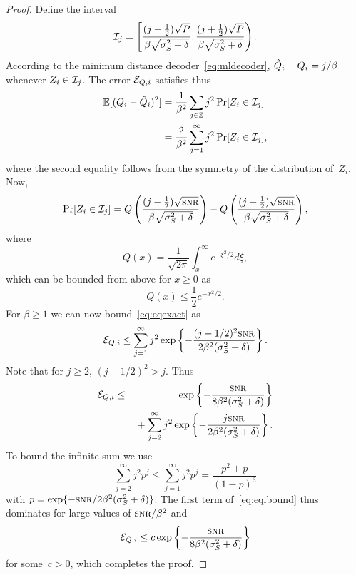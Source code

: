 \begin{proof}
  Define the interval
  \begin{equation*}
    \mathcal{I}_j = \left[ \frac{(j - \frac12) \sqrt{P}}{\beta \sqrt{{\sigma_S^2} + \delta}},
    \frac{(j + \frac12) \sqrt{P}}{\beta \sqrt{{\sigma_S^2} + \delta}} \right).
  \end{equation*}
  According to the minimum distance decoder~\eqref{eq:mldecoder}, $\hat{Q}_i - Q_i
  = j/\beta$ whenever $Z_i \in \mathcal{I}_j$.  The error ${{\mathcal{E}}_{Q,i}}$ satisfies thus
  \begin{align}
    \mathbb{E}[(Q_i - \hat{Q}_i)^2] &= \frac{1}{\beta^2} \sum_{j \in \mathbb{Z}} j^2 \Pr[Z_i \in
    \mathcal{I}_j]  \nonumber \\
    &= \frac{2}{\beta^2} \sum_{j = 1}^\infty j^2 \Pr[Z_i \in \mathcal{I}_j],
    \label{eq:eqexact}
  \end{align}
  where the second equality follows from the symmetry of the distribution
  of~$Z_i$. Now,
  \begin{equation*}
    \Pr[Z_i \in \I_j] = Q\left( \frac{(j - \frac12) \sqrt \snr}{\beta \sqrt{\ssq
    + \delta }} \right) - Q\left( \frac{(j + \frac12) \sqrt{\snr}}{\beta
    \sqrt{\ssq + \delta}} \right),
  \end{equation*}
  where
  \begin{equation*}
    Q(x) = \frac{1}{\sqrt{2\pi}} \int_x^\infty e^{-\xi^2/2} d\xi,
  \end{equation*}
  which can be bounded from above for $x \ge 0$ as
  \begin{equation*}
    Q(x) \le \frac12 e^{-x^2/2}.
  \end{equation*}
  For $\beta \ge 1$ we can now bound~\eqref{eq:eqexact} as
  \begin{equation*}
    \Eqi \le \sum_{j=1}^\infty j^2 \exp\left\{ - \frac{(j - 1/2)^2
    \snr}{2\beta^2(\ssq + \delta)} \right\}.
  \end{equation*}
  Note that for $j \ge 2$, $(j - 1/2)^2 > j$.  Thus
  \begin{eqnarray}
    \Eqi &\le & \exp \left \{ - \frac{\snr}{8 \beta^2 (\ssq +\delta)} \right\}
    \nonumber \\
    & & \mbox{} + 
    \sum_{j = 2}^\infty j^2 \exp \left \{ - \frac{j \snr}{2\beta^2(\ssq
    +\delta)}
    \right\}. \label{eq:eqibound}
  \end{eqnarray}
  To bound the infinite sum we use 
  \begin{equation}
    \label{eq:geomsum}
    \sum_{j=2}^\infty j^2 p^j \le \sum_{j=1}^\infty j^2 p^j = 
    \frac{p^2+p}{(1-p)^3}
  \end{equation}
  with $p = \exp\{-\snr/2 \beta^2 (\ssq+\delta)\}$. The first term
  of~\eqref{eq:eqibound} thus dominates for large values of
  $\snr/\beta^2$ and
  \begin{equation*}
    \Eqi \le c\exp\left\{ - \frac{\snr}{8 \beta^2 (\ssq + \delta)} \right\}
  \end{equation*}
  for some~$c > 0$, which completes the proof. 
\end{proof}

